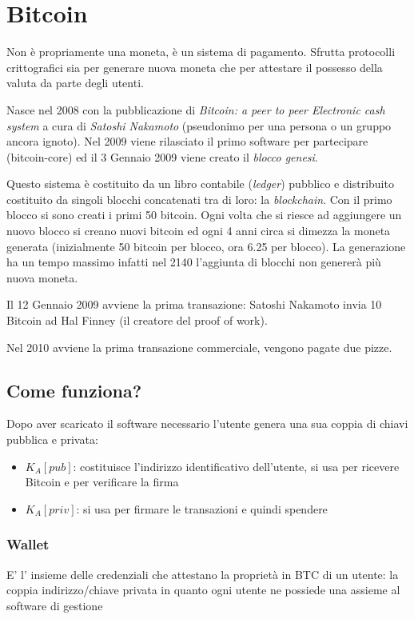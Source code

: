 \section{Bitcoin}

Non è propriamente una moneta, è un sistema di pagamento.
Sfrutta protocolli crittografici sia per generare nuova moneta che per attestare il possesso della valuta da parte degli utenti.

Nasce nel 2008 con la pubblicazione di \emph{Bitcoin: a peer to peer Electronic cash system} a cura di \emph{Satoshi Nakamoto} (pseudonimo per una persona o un gruppo ancora ignoto).
Nel 2009 viene rilasciato il primo software per partecipare (bitcoin-core) ed il 3 Gennaio 2009 viene creato il \emph{blocco genesi}.

Questo sistema è costituito da un libro contabile (\emph{ledger}) pubblico e distribuito costituito da singoli blocchi concatenati tra di loro: la \emph{blockchain}.
Con il primo blocco si sono creati i primi 50 bitcoin.
Ogni volta che si riesce ad aggiungere un nuovo blocco si creano nuovi bitcoin ed ogni 4 anni circa si dimezza la moneta generata (inizialmente 50 bitcoin per blocco, ora 6.25 per blocco).
La generazione ha un tempo massimo infatti nel 2140 l'aggiunta di blocchi non genererà più nuova moneta.

Il 12 Gennaio 2009 avviene la prima transazione: Satoshi Nakamoto invia 10 Bitcoin ad Hal Finney (il creatore del proof of work).

Nel 2010 avviene la prima transazione commerciale, vengono pagate due pizze.

\subsection{Come funziona?}
Dopo aver scaricato il software necessario l'utente genera una sua coppia di chiavi pubblica e privata:
\begin{itemize}
    \item $K_A[pub]$: costituisce l'indirizzo identificativo dell'utente, si usa per ricevere Bitcoin e per verificare la firma
    \item $K_A[priv]$: si usa per firmare le transazioni e quindi spendere
\end{itemize}

\subsubsection{Wallet}
E' l' insieme delle credenziali che attestano la proprietà in BTC di un utente: la coppia indirizzo/chiave privata in quanto ogni utente ne possiede una assieme al software di gestione

